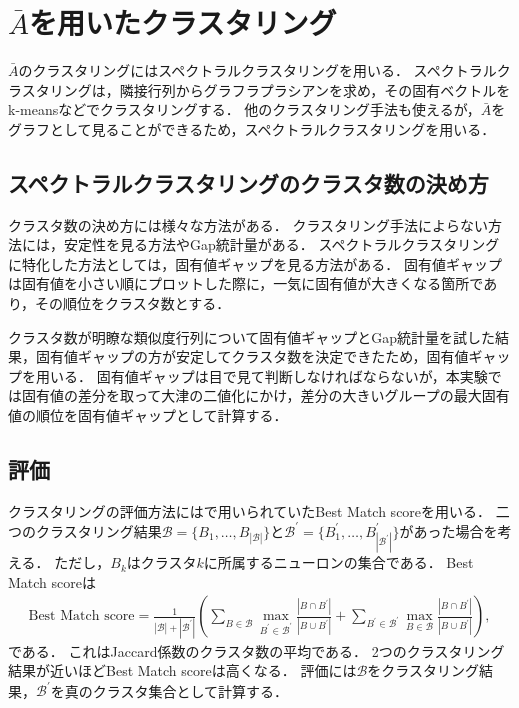 \section{$\bar{A}$を用いたクラスタリング}
$\bar{A}$のクラスタリングにはスペクトラルクラスタリングを用いる．
スペクトラルクラスタリングは，隣接行列からグラフラプラシアンを求め，その固有ベクトルをk-meansなどでクラスタリングする．
他のクラスタリング手法も使えるが，$\bar{A}$をグラフとして見ることができるため，スペクトラルクラスタリングを用いる．

\subsection{スペクトラルクラスタリングのクラスタ数の決め方}
クラスタ数の決め方には様々な方法がある．
クラスタリング手法によらない方法には，安定性を見る方法\cite{Ben-Hur}やGap統計量\cite{Tibshirani}がある．
スペクトラルクラスタリングに特化した方法としては，固有値ギャップを見る方法\cite{VonLuxburg}がある．
固有値ギャップは固有値を小さい順にプロットした際に，一気に固有値が大きくなる箇所であり，その順位をクラスタ数とする．

クラスタ数が明瞭な類似度行列について固有値ギャップとGap統計量を試した結果，固有値ギャップの方が安定してクラスタ数を決定できたため，固有値ギャップを用いる．
固有値ギャップは目で見て判断しなければならないが，本実験では固有値の差分を取って大津の二値化にかけ，差分の大きいグループの最大固有値の順位を固有値ギャップとして計算する．

\subsection{評価}
クラスタリングの評価方法には\cite{Molter2018}で用いられていたBest Match scoreを用いる．
二つのクラスタリング結果$\mathcal{B} = \{B_1, \dots, B_{|\mathcal{B}|}\}$と$\mathcal{B^\prime} = \{B^\prime_1, \dots, B^\prime_{|\mathcal{B}^\prime|}\}$があった場合を考える．
ただし，$B_k$はクラスタ$k$に所属するニューロンの集合である．
Best Match scoreは
\begin{align}
	\text{Best Match score} = \frac{1}{|\mathcal{B}| + |\mathcal{B^\prime}|} \left( \sum_{B \in \mathcal{B}} \max_{B^\prime \in \mathcal{B^\prime}} \frac{|B \cap B^\prime|}{|B \cup B^\prime|} + \sum_{B^\prime \in \mathcal{B^\prime}} \max_{B \in \mathcal{B}} \frac{|B \cap B^\prime|}{|B \cup B^\prime|} \right),
\end{align}
である．
これはJaccard係数のクラスタ数の平均である．
2つのクラスタリング結果が近いほどBest Match scoreは高くなる．
評価には$\mathcal{B}$をクラスタリング結果，$\mathcal{B}^\prime$を真のクラスタ集合として計算する．
